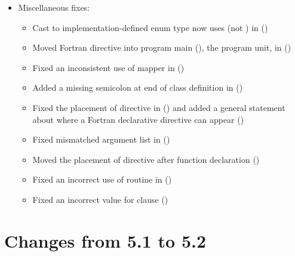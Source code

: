 \begin{itemize}
\item Miscellaneous fixes:
\begin{itemize}
  \item Cast to implementation-defined enum type  
    now uses  (not ) in
    ()
  \item Moved Fortran  directive into program main (), 
    the program unit, in 
    ()
  \item Fixed an inconsistent use of mapper in 
    ()
  \item Added a missing semicolon at end of  class definition in
    ()
  \item Fixed the placement of  directive in 
     ()
    and added a general statement about where a Fortran declarative
    directive can appear ()
  \item Fixed mismatched argument list in 
    ()
  \item Moved the placement of 
    directive after function declaration
    ()
  \item Fixed an incorrect use of  routine in 
    ()
  \item Fixed an incorrect value for  clause
    ()
\end{itemize}

\end{itemize}

\section{Changes from 5.1 to 5.2}
\label{sec:history_51_to_52}

